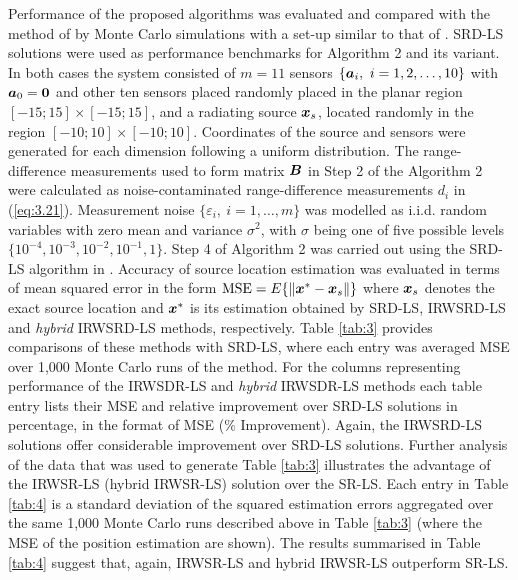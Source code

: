 Performance of the proposed algorithms was evaluated and compared with the method of  \cite{BeckStLi} by Monte Carlo simulations with a set-up similar to that of \cite{BeckStLi}. SRD-LS solutions were used as performance benchmarks for Algorithm 2 and its variant. In both cases the system consisted of $m = 11$ sensors $\{\mbox{\boldmath$a$}_i, \ i=1, 2,\ldots, 10\}$ with $\mbox{\boldmath$a$}_0 = \mbox{\boldmath{$0$}}$ and other ten sensors placed randomly placed in the planar region $[-15;15]\times[-15;15]$, and a radiating source $\mbox{\boldmath$x$}_s$, located randomly in the region $[-10;10]\times[-10;10]$. Coordinates of the source and sensors were generated for each dimension following a uniform distribution. The range-difference measurements used to form  matrix $\mbox{\boldmath$B$}$ in Step 2 of the Algorithm 2 were calculated as noise-contaminated range-difference measurements $d_i$ in (\ref{eq:3.21}). Measurement noise $\{\varepsilon_i, \ i = 1,\ldots, m\}$ was modelled as i.i.d. random variables with zero mean and variance $\sigma^2$, with $\sigma$ being one of five possible levels $\{10^{-4}, 10^{-3}, 10^{-2}, 10^{-1}, 1\}$. Step 4 of Algorithm 2 was carried out using the SRD-LS algorithm in \cite{BeckStLi}.  Accuracy of source location estimation was evaluated in terms of mean squared error in the form $\mbox{MSE} = E\{\|\mbox{\boldmath$x$}^*-\mbox{\boldmath$x$}_s\|\}$ where $\mbox{\boldmath$x$}_s$ denotes the exact source location and $\mbox{\boldmath$x$}^*$ is its estimation obtained by SRD-LS, IRWSRD-LS and \textit{hybrid} IRWSRD-LS methods, respectively. Table \ref{tab:3} provides comparisons of these methods with SRD-LS, where each entry was averaged MSE over 1,000 Monte Carlo runs of the method. For the columns representing performance of the IRWSDR-LS and \textit{hybrid} IRWSDR-LS methods each table entry lists their MSE and relative improvement over SRD-LS solutions in percentage, in the format of MSE ($\%$ Improvement). Again, the IRWSRD-LS solutions offer considerable improvement over SRD-LS solutions. Further analysis of the data that was used to generate Table \ref{tab:3} illustrates the advantage of the IRWSR-LS (hybrid IRWSR-LS) solution over the SR-LS. 
Each entry in Table \ref{tab:4} is a standard deviation of the squared  estimation errors  aggregated over the  same 1,000 Monte Carlo runs described above in Table \ref{tab:3} (where the MSE of the position estimation are shown). The results summarised in Table \ref{tab:4} suggest that, again, IRWSR-LS and hybrid IRWSR-LS outperform SR-LS. 
\setlength{\intextsep}{5pt}

